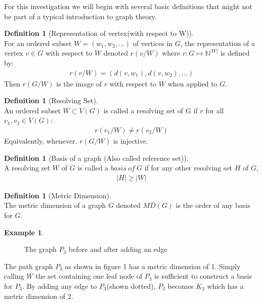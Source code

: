 \documentclass[11pt]{amsart}
\theoremstyle{plain}  %
\theoremstyle{definition}
\newtheorem{defin}[thm]{{Definition}}
\newtheorem{ex}[thm]{Example}
\theoremstyle{remark}
\numberwithin{equation}{thm}
\begin{document}
    For this investigation we will begin with several basic definitions that might not be part of a typical introduction to graph theory.

 \begin{defin}[Representation of vertex(with respect to W)]\ \\
    For an ordered subset $W=(w_1, w_2, ...)$ of vertices in $G$, the representation of a vertex $v \in G$ with respect to $W$ denoted $r(v/W)$ where $r:G\mapsto \mathbb{N}^{|W|}$ is defined by:
  \begin{align*}
  r(v/W)=(d(v,w_1), d(v,w_2), ...)
  \end{align*}
  Then $r(G/W)$ is the image of $r$ with respect to $W$ when applied to $G$.
 \end{defin}
    
 \begin{defin}[Resolving Set]\ \\
  An ordered subset $W \subset V(G)$ is called a resolving set of G if $r$ for all $v_1, v_2 \in V(G)$: 
  \begin{align*}
  r(v_1/W) \neq  r(v_2/W)
  \end{align*}
  Equivalently, whenever. $r(G/W)$ is injective.
 \end{defin}
 
 \begin{defin}[Basis of a graph (Also called reference set)]\ \\
  A resolving set $W$ of $G$ is called a $basis\ of\ G$ if for any other resolving set $H$ of $G$, 
  \begin{align*}
   |H| \geq |W|
  \end{align*}

 \end{defin}
 
 \begin{defin}[Metric Dimension]\ \\
  The metric dimension of a graph $G$ denoted $MD(G)$ is the order of any basis for $G$.
 \end{defin}

\begin{ex}

\begin{figure}
\caption{The graph $P_3$ before and after adding an edge}
\end{figure}
The path graph $P_3$ as shown in figure 1 has a metric dimension of 1. Simply calling $W$ the set containing one leaf node of $P_3$ is sufficient to construct a basis for $P_3$.
By adding any edge to $P_3$(shown dotted), $P_3$ becomes $K_3$ which has a metric dimension of 2.
\end{ex}
\end{document}
